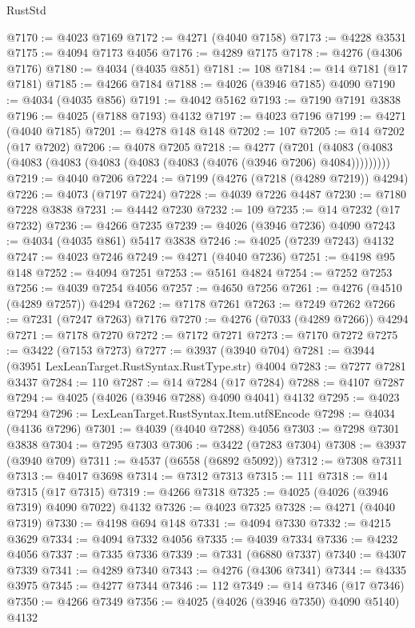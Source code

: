 \begin{lexlean}{RustStd}
\begin{coremodule}
@7170 := @4023 @7169
@7172 := @4271 (@4040 @7158)
@7173 := @4228 @3531
@7175 := @4094 @7173 @4056
@7176 := @4289 @7175
@7178 := @4276 (@4306 @7176)
@7180 := @4034 (@4035 @851)
@7181 := 108
@7184 := @14 @7181 (@17 @7181)
@7185 := @4266 @7184
@7188 := @4026 (@3946 @7185) @4090
@7190 := @4034 (@4035 @856)
@7191 := @4042 @5162
@7193 := @7190 @7191 @3838
@7196 := @4025 (@7188 @7193) @4132
@7197 := @4023 @7196
@7199 := @4271 (@4040 @7185)
@7201 := @4278 @148 @148
@7202 := 107
@7205 := @14 @7202 (@17 @7202)
@7206 := @4078 @7205
@7218 := @4277
    (@7201 (@4083 (@4083 (@4083 (@4083 (@4083 (@4083 (@4083 (@4076 (@3946 @7206) @4084)))))))))
@7219 := @4040 @7206
@7224 := @7199 (@4276 (@7218 (@4289 @7219)) @4294)
@7226 := @4073 (@7197 @7224)
@7228 := @4039 @7226 @4487
@7230 := @7180 @7228 @3838
@7231 := @4442 @7230
@7232 := 109
@7235 := @14 @7232 (@17 @7232)
@7236 := @4266 @7235
@7239 := @4026 (@3946 @7236) @4090
@7243 := @4034 (@4035 @861) @5417 @3838
@7246 := @4025 (@7239 @7243) @4132
@7247 := @4023 @7246
@7249 := @4271 (@4040 @7236)
@7251 := @4198 @95 @148
@7252 := @4094 @7251
@7253 := @5161 @4824
@7254 := @7252 @7253
@7256 := @4039 @7254 @4056
@7257 := @4650 @7256
@7261 := @4276 (@4510 (@4289 @7257)) @4294
@7262 := @7178 @7261
@7263 := @7249 @7262
@7266 := @7231 (@7247 @7263) @7176
@7270 := @4276 (@7033 (@4289 @7266)) @4294
@7271 := @7178 @7270
@7272 := @7172 @7271
@7273 := @7170 @7272
@7275 := @3422 (@7153 @7273)
@7277 := @3937 (@3940 @704)
@7281 := @3944 (@3951 LexLeanTarget.RustSyntax.RustType.str) @4004
@7283 := @7277 @7281 @3437
@7284 := 110
@7287 := @14 @7284 (@17 @7284)
@7288 := @4107 @7287
@7294 := @4025 (@4026 (@3946 @7288) @4090 @4041) @4132
@7295 := @4023 @7294
@7296 := LexLeanTarget.RustSyntax.Item.utf8Encode
@7298 := @4034 (@4136 @7296)
@7301 := @4039 (@4040 @7288) @4056
@7303 := @7298 @7301 @3838
@7304 := @7295 @7303
@7306 := @3422 (@7283 @7304)
@7308 := @3937 (@3940 @709)
@7311 := @4537 (@6558 (@6892 @5092))
@7312 := @7308 @7311
@7313 := @4017 @3698
@7314 := @7312 @7313
@7315 := 111
@7318 := @14 @7315 (@17 @7315)
@7319 := @4266 @7318
@7325 := @4025 (@4026 (@3946 @7319) @4090 @7022) @4132
@7326 := @4023 @7325
@7328 := @4271 (@4040 @7319)
@7330 := @4198 @694 @148
@7331 := @4094 @7330
@7332 := @4215 @3629
@7334 := @4094 @7332 @4056
@7335 := @4039 @7334
@7336 := @4232 @4056
@7337 := @7335 @7336
@7339 := @7331 (@6880 @7337)
@7340 := @4307 @7339
@7341 := @4289 @7340
@7343 := @4276 (@4306 @7341)
@7344 := @4335 @3975
@7345 := @4277 @7344
@7346 := 112
@7349 := @14 @7346 (@17 @7346)
@7350 := @4266 @7349
@7356 := @4025 (@4026 (@3946 @7350) @4090 @5140) @4132

\end{coremodule}
\end{lexlean}
